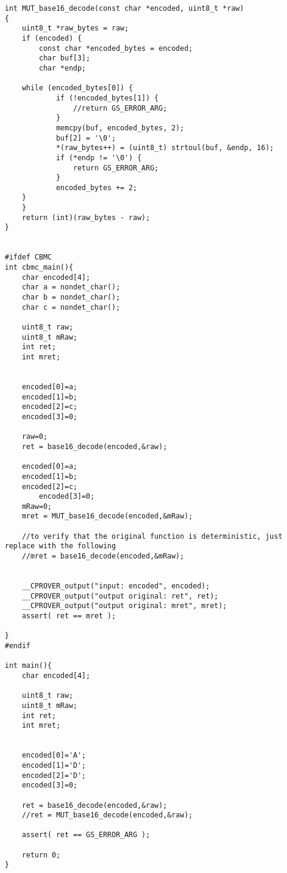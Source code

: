 \begin{lstlisting}[style=CStyle, caption=Second example of code for the identification of inputs with CBMC., label=GSLaugmentationTwo]
int MUT_base16_decode(const char *encoded, uint8_t *raw)
{
    uint8_t *raw_bytes = raw;
    if (encoded) {
        const char *encoded_bytes = encoded;
        char buf[3];
        char *endp;

	while (encoded_bytes[0]) {
            if (!encoded_bytes[1]) {
                //return GS_ERROR_ARG;
            }
            memcpy(buf, encoded_bytes, 2);
            buf[2] = '\0';
            *(raw_bytes++) = (uint8_t) strtoul(buf, &endp, 16);
            if (*endp != '\0') {
                return GS_ERROR_ARG;
            }
            encoded_bytes += 2;
	}
    }
    return (int)(raw_bytes - raw);
}


#ifdef CBMC
int cbmc_main(){
    char encoded[4];
	char a = nondet_char();
	char b = nondet_char();
	char c = nondet_char();

	uint8_t raw;
	uint8_t mRaw;
	int ret;
	int mret;

    
	encoded[0]=a;
	encoded[1]=b;
	encoded[2]=c;
    encoded[3]=0;

	raw=0;
    ret = base16_decode(encoded,&raw);

	encoded[0]=a;
	encoded[1]=b;
	encoded[2]=c;
        encoded[3]=0;
	mRaw=0;
    mret = MUT_base16_decode(encoded,&mRaw);
    
    //to verify that the original function is deterministic, just replace with the following
    //mret = base16_decode(encoded,&mRaw);


	__CPROVER_output("input: encoded", encoded);
	__CPROVER_output("output original: ret", ret);
	__CPROVER_output("output original: mret", mret);
	assert( ret == mret );
        
}
#endif

int main(){
    char encoded[4];

	uint8_t raw;
	uint8_t mRaw;
	int ret;
	int mret;

    
	encoded[0]='A';
	encoded[1]='D';
	encoded[2]='D';
    encoded[3]=0;

    ret = base16_decode(encoded,&raw);
    //ret = MUT_base16_decode(encoded,&raw);

	assert( ret == GS_ERROR_ARG );

    return 0;
}
\end{lstlisting}

